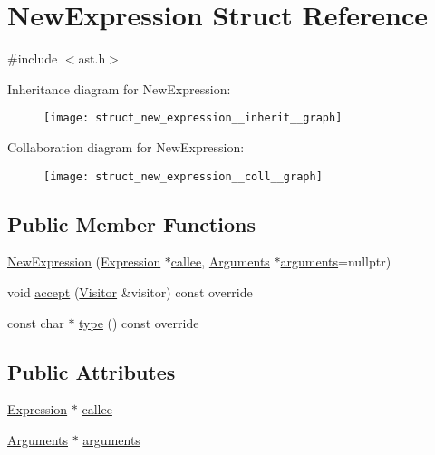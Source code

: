 \hypertarget{struct_new_expression}{}\section{New\+Expression Struct Reference}
\label{struct_new_expression}


{\ttfamily \#include $<$ast.\+h$>$}



Inheritance diagram for New\+Expression\+:\nopagebreak
\begin{figure}[H]
\begin{center}
\leavevmode
\texttt{[image: struct\_new\_expression\_\_inherit\_\_graph]}
\end{center}
\end{figure}


Collaboration diagram for New\+Expression\+:\nopagebreak
\begin{figure}[H]
\begin{center}
\leavevmode
\texttt{[image: struct\_new\_expression\_\_coll\_\_graph]}
\end{center}
\end{figure}
\subsection*{Public Member Functions}
\begin{DoxyCompactItemize}
\item 
\hyperlink{struct_new_expression_a8a97ab4337fec49be339e232c1992fcb}{New\+Expression} (\hyperlink{struct_expression}{Expression} $\ast$\hyperlink{struct_new_expression_aa56c9b8daa3725a54fdb2b8fce63d237}{callee}, \hyperlink{struct_arguments}{Arguments} $\ast$\hyperlink{struct_new_expression_a4d43c4128966ccb728f92a0204d04eaa}{arguments}=nullptr)
\item 
void \hyperlink{struct_new_expression_a02f3b4798c1351cee31f27d0cbf6346f}{accept} (\hyperlink{struct_visitor}{Visitor} \&visitor) const override
\item 
const char $\ast$ \hyperlink{struct_new_expression_a30486948a74f6c149f0c8a05b580b360}{type} () const override
\end{DoxyCompactItemize}
\subsection*{Public Attributes}
\begin{DoxyCompactItemize}
\item 
\hyperlink{struct_expression}{Expression} $\ast$ \hyperlink{struct_new_expression_aa56c9b8daa3725a54fdb2b8fce63d237}{callee}
\item 
\hyperlink{struct_arguments}{Arguments} $\ast$ \hyperlink{struct_new_expression_a4d43c4128966ccb728f92a0204d04eaa}{arguments}
\end{DoxyCompactItemize}


